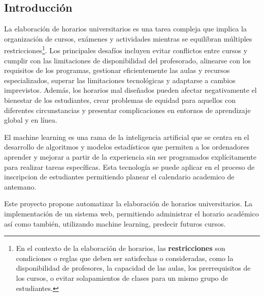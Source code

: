 \subsection{Introducción}

La elaboración de horarios universitarios es una tarea compleja que implica la organización de cursos, exámenes y actividades mientras se equilibran múltiples restricciones\footnote{En el contexto de la elaboración de horarios, las \textbf{restricciones} son condiciones o reglas que deben ser satisfechas o consideradas, como la disponibilidad de profesores, la capacidad de las aulas, los prerrequisitos de los cursos, o evitar solapamientos de clases para un mismo grupo de estudiantes.}.
Los principales desafíos incluyen evitar conflictos entre cursos y cumplir con las limitaciones de disponibilidad del profesorado, alinearse con los requisitos de los programas, gestionar eficientemente las aulas y recursos especializados, superar las limitaciones tecnológicas y adaptarse a cambios imprevistos.
Además, los horarios mal diseñados pueden afectar negativamente el bienestar de los estudiantes, crear problemas de equidad para aquellos con diferentes circunstancias y presentar complicaciones en entornos de aprendizaje global y en línea.

El machine learning es una rama de la inteligencia artificial que se centra en el desarrollo de algoritmos y modelos estadísticos que permiten a los ordenadores aprender y mejorar a partir de la experiencia sin ser programados explícitamente para realizar tareas específicas.
Esta tecnología se puede aplicar en el proceso de inscripcion de estudiantes permitiendo planear el calendario academico de antemano.

Este proyecto propone automatizar la elaboración de horarios universitarios.
La implementación de un sistema web, permitiendo administrar el horario académico así como también, utilizando machine learning, predecir futuros cursos.
